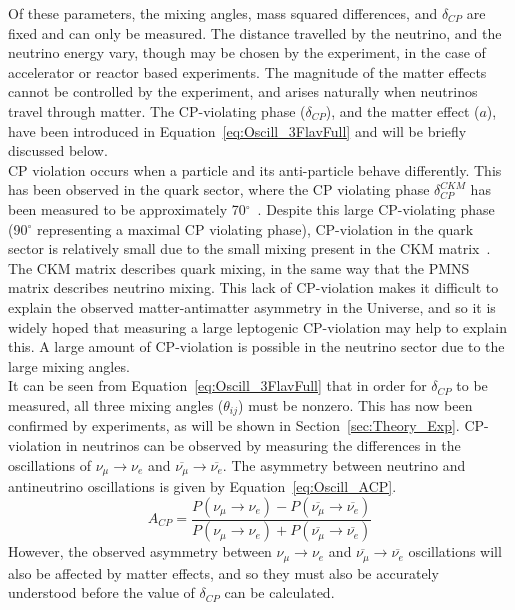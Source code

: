 Of these parameters, the mixing angles, mass squared differences, and $\delta_{CP}$ are fixed and can only be measured. The distance travelled by the neutrino, and the neutrino energy vary, though may be chosen by the experiment, in the case of accelerator or reactor based experiments. The magnitude of the matter effects cannot be controlled by the experiment, and arises naturally when neutrinos travel through matter. The CP-violating phase ($\delta_{CP}$), and the matter effect ($a$), have been introduced in Equation~\ref{eq:Oscill_3FlavFull} and will be briefly discussed below. \\

CP violation occurs when a particle and its anti-particle behave differently. This has been observed in the quark sector, where the CP violating phase $\delta^{CKM}_{CP}$ has been measured to be approximately 70$^{\circ}$~\citep{PDGReview}. Despite this large CP-violating phase (90$^{\circ}$ representing a maximal CP violating phase), CP-violation in the quark sector is relatively small due to the small mixing present in the CKM matrix~\citep{PhysRevLett.10.531, Kobayashi:1973fv}. The CKM matrix describes quark mixing, in the same way that the PMNS matrix describes neutrino mixing. This lack of CP-violation makes it difficult to explain the observed matter-antimatter asymmetry in the Universe, and so it is widely hoped that measuring a large leptogenic CP-violation may help to explain this. A large amount of CP-violation is possible in the neutrino sector due to the large mixing angles. \\ 

It can be seen from Equation~\ref{eq:Oscill_3FlavFull} that in order for $\delta_{CP}$ to be measured, all three mixing angles ($\theta_{ij}$) must be nonzero. This has now been confirmed by experiments, as will be shown in Section~\ref{sec:Theory_Exp}. CP-violation in neutrinos can be observed by measuring the differences in the oscillations of $\nu_{\mu}\rightarrow\nu_{e}$ and $\overline{\nu_{\mu}}\rightarrow\overline{\nu_{e}}$. The asymmetry between neutrino and antineutrino oscillations is given by Equation~\ref{eq:Oscill_ACP}.
\begin{equation}
  \label{eq:Oscill_ACP}
  A_{CP} = \frac{ P(\nu_{\mu}\rightarrow\nu_{e}) - P(\overline{\nu_{\mu}}\rightarrow\overline{\nu_{e}}) } { P(\nu_{\mu}\rightarrow\nu_{e}) + P(\overline{\nu_{\mu}}\rightarrow\overline{\nu_{e}}) }
\end{equation}
However, the observed asymmetry between $\nu_{\mu}\rightarrow\nu_{e}$ and $\overline{\nu_{\mu}}\rightarrow\overline{\nu_{e}}$ oscillations will also be affected by matter effects, and so they must also be accurately understood before the value of $\delta_{CP}$ can be calculated. \\

